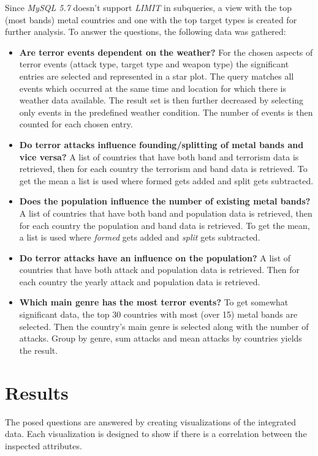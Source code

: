 Since \emph{MySQL 5.7} doesn't support \emph{LIMIT} in subqueries, a view with the top (most bands) metal countries and one with the top target types is created for further analysis. To answer the questions, the following data was gathered:
\begin{itemize}
\item \textbf{Are terror events dependent on the weather?}  For the chosen aspects of terror events (attack type, target type and weapon type) the significant entries are selected and represented in a star plot. The query matches all events which occurred at the same time and location for which there is weather data available. The result set is then further decreased by selecting only events in the predefined weather condition. The number of events is then counted for each chosen entry.

\item \textbf{Do terror attacks influence founding/splitting of metal bands and vice versa?}
A list of countries that have both band and terrorism data is retrieved, then for each country the terrorism and band data is retrieved. To get the mean a list is used where formed gets added and split gets subtracted.
\item \textbf{Does the population influence the number of existing metal bands?}
A list of countries that have both band and population data is retrieved, then for each country the population and band data is retrieved. To get the mean, a list is used where \emph{formed} gets added and \emph{split} gets subtracted.
\item \textbf{Do terror attacks have an influence on the population?}
A list of countries that have both attack and population data is retrieved. Then for each country the yearly attack and population data is retrieved.
\item \textbf{Which main genre has the most terror events?} To get somewhat significant data, the top 30 countries with most (over 15) metal bands are selected. Then the country's main genre is selected along with the number of attacks. Group by genre, sum attacks and mean attacks by countries yields the result.
\end{itemize}



\newpage
\section{Results}
The posed questions are answered by creating visualizations of the integrated data. Each visualization is designed to show if there is a correlation between the inspected attributes.

